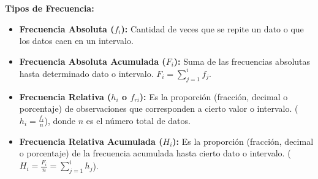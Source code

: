 \documentclass[12pt, letterpaper]{article}
\begin{document}
\textbf{Tipos de Frecuencia:}
\begin{itemize}
    \item \textbf{Frecuencia Absoluta ($f_i$):} Cantidad de veces que se repite un dato o que los datos caen en un intervalo.
    \item \textbf{Frecuencia Absoluta Acumulada ($F_i$):} Suma de las frecuencias absolutas hasta determinado dato o intervalo. $F_i = \sum_{j=1}^{i} f_j$.
    \item \textbf{Frecuencia Relativa ($h_i$ o $f_{ri}$):} Es la proporción (fracción, decimal o porcentaje) de observaciones que corresponden a cierto valor o intervalo. ($h_i = \frac{f_i}{n}$), donde $n$ es el número total de datos.
    \item \textbf{Frecuencia Relativa Acumulada ($H_i$):} Es la proporción (fracción, decimal o porcentaje) de la frecuencia acumulada hasta cierto dato o intervalo. ($H_i = \frac{F_i}{n} = \sum_{j=1}^{i} h_j$).
\end{itemize}
\end{document}
